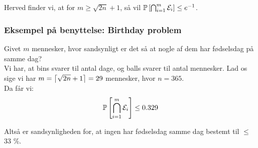 Herved finder vi, at for $m \geq \sqrt{2n} + 1$, så vil $\mathbb{P} \left[  \bigcap_{i=1}^m {\mathcal{E}}_i  \right] \leq e^{-1}$.


\subsubsection{Eksempel på benyttelse: Birthday problem}
Givet $m$ mennesker, hvor sandsynligt er det så at nogle af dem har fødselsdag på samme dag?\\

Vi har, at bins svarer til antal dage, og balls svarer til antal mennesker. Lad os sige vi har $m = \left\lceil \sqrt{2n} + 1 \right\rceil = 29$ mennesker, hvor $n = 365$.\\

Da får vi:
$$
\mathbb{P} \left[  \bigcap_{i=1}^m {\mathcal{E}}_i  \right] \leq 0.329
$$

Altså er sandsynligheden for, at ingen har fødselsdag samme dag bestemt til $\leq$ 33 \%.
